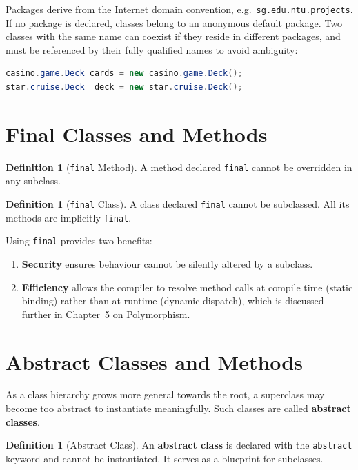 \documentclass[11pt, a4paper, notitlepage]{report}
\theoremstyle{definition}
\newtheorem{definition}[theorem]{Definition}
\theoremstyle{remark}
\theoremstyle{definition}
\begin{document}
Packages derive from the Internet domain convention, e.g.\ \texttt{sg.edu.ntu.projects}. If no package is declared, classes belong to an anonymous default package. Two classes with the same name can coexist if they reside in different packages, and must be referenced by their fully qualified names to avoid ambiguity:

\begin{lstlisting}[language=Java]
casino.game.Deck cards = new casino.game.Deck();
star.cruise.Deck  deck = new star.cruise.Deck();
\end{lstlisting}

%
\section{Final Classes and Methods}
\label{sec:ch3-final}

\begin{definition}[\texttt{final} Method]
\label{def:ch3-final-method}
A method declared \texttt{final} cannot be overridden in any subclass.
\end{definition}

\begin{definition}[\texttt{final} Class]
\label{def:ch3-final-class}
A class declared \texttt{final} cannot be subclassed. All its methods are implicitly \texttt{final}.
\end{definition}

Using \texttt{final} provides two benefits:
\begin{enumerate}
    \item \textbf{Security}  ensures behaviour cannot be silently altered by a subclass.
    \item \textbf{Efficiency}  allows the compiler to resolve method calls at compile time (static binding) rather than at runtime (dynamic dispatch), which is discussed further in Chapter~5 on Polymorphism.
\end{enumerate}

%
\section{Abstract Classes and Methods}
\label{sec:ch3-abstract}

As a class hierarchy grows more general towards the root, a superclass may become too abstract to instantiate meaningfully. Such classes are called \textbf{abstract classes}.

\begin{definition}[Abstract Class]
\label{def:ch3-abstract-class}
An \textbf{abstract class} is declared with the \texttt{abstract} keyword and cannot be instantiated. It serves as a blueprint for subclasses.
\end{definition}
\end{document}
